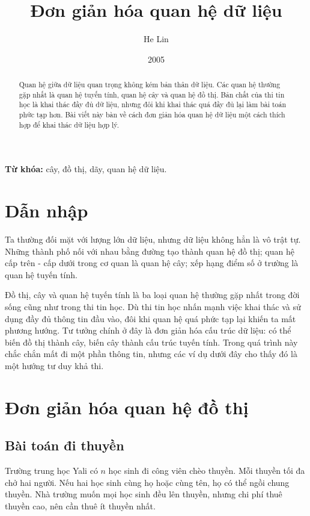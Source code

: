 \documentclass[11pt]{article}
\title{Đơn giản hóa quan hệ dữ liệu}
\author{He Lin}
\date{2005}
\begin{document}
\maketitle


\begin{abstract}
Quan hệ giữa dữ liệu quan trọng không kém bản thân dữ liệu. Các quan hệ thường
gặp nhất là quan hệ tuyến tính, quan hệ cây và quan hệ đồ thị. Bản chất của
thi tin học là khai thác đầy đủ dữ liệu, nhưng đôi khi khai thác quá đầy đủ
lại làm bài toán phức tạp hơn. Bài viết này bàn về cách đơn giản hóa quan hệ
dữ liệu một cách thích hợp để khai thác dữ liệu hợp lý.
\end{abstract}

\noindent\textbf{Từ khóa:} cây, đồ thị, dãy, quan hệ dữ liệu.

\section{Dẫn nhập}

Ta thường đối mặt với lượng lớn dữ liệu, nhưng dữ liệu không hẳn là vô trật
tự. Những thành phố nối với nhau bằng đường tạo thành quan hệ đồ thị; quan hệ
cấp trên - cấp dưới trong cơ quan là quan hệ cây; xếp hạng điểm số ở trường
là quan hệ tuyến tính.

Đồ thị, cây và quan hệ tuyến tính là ba loại quan hệ thường gặp nhất trong
đời sống cũng như trong thi tin học. Dù thi tin học nhấn mạnh việc khai thác
và sử dụng đầy đủ thông tin đầu vào, đôi khi quan hệ quá phức tạp lại khiến
ta mất phương hướng. Tư tưởng chính ở đây là đơn giản hóa cấu trúc dữ liệu:
có thể biến đồ thị thành cây, biến cây thành cấu trúc tuyến tính. Trong quá
trình này chắc chắn mất đi một phần thông tin, nhưng các ví dụ dưới đây cho
thấy đó là một hướng tư duy khả thi.

\section{Đơn giản hóa quan hệ đồ thị}

\subsection{Bài toán đi thuyền}

Trường trung học Yali có \(n\) học sinh đi công viên chèo thuyền. Mỗi thuyền
tối đa chở hai người. Nếu hai học sinh cùng họ hoặc cùng tên, họ có thể ngồi
chung thuyền. Nhà trường muốn mọi học sinh đều lên thuyền, nhưng chi phí thuê
thuyền cao, nên cần thuê ít thuyền nhất.
\end{document}
